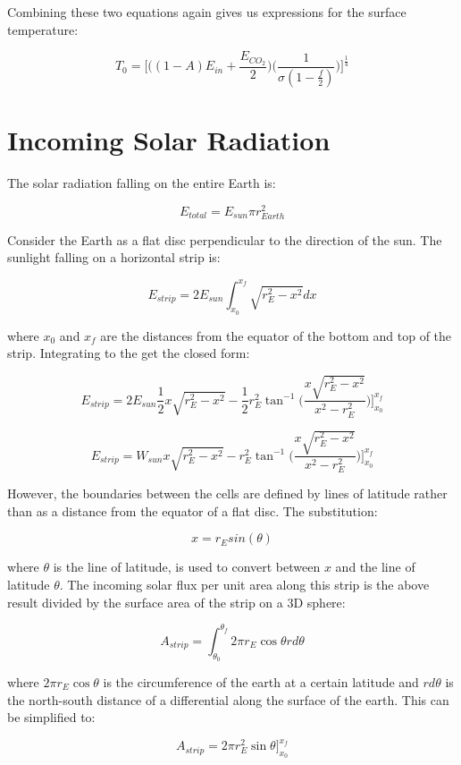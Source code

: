 \documentclass[12pt]{article} %
\begin{document}
Combining these two equations again gives us expressions for the surface temperature:

$$\boxed{T_0 = \bigg[ \bigg((1-A)E_{in} + \frac{E_{CO_2}}{2}\bigg)\bigg(\frac{1}{\sigma(1-\frac{f}{2})}\bigg)\bigg] ^{\frac{1}{4}}}$$

\newpage
\section{Incoming Solar Radiation}
\label{sec:radiation}

The solar radiation falling on the entire Earth is:

$$E_{total} = E_{sun} \pi r_{Earth}^2$$

Consider the Earth as a flat disc perpendicular to the direction of the sun. The sunlight falling on a horizontal strip is:

$$E_{strip} = 2 E_{sun} \int_{x_0}^{x_f} \sqrt{r_{E}^2 - x^2} dx$$


where $x_0$ and $x_f$ are the distances from the equator of the bottom and top of the strip. Integrating to the get the closed form:

$$E_{strip} = 2 E_{sun} \frac{1}{2} x \sqrt{r_{E}^2 - x^2} - \frac{1}{2} r_{E}^2 \tan^{-1}\bigg({\frac{x \sqrt{r_{E}^2 - x^2}}{x^2 - r_{E}^2 }}\bigg)\bigg]_{x_0}^{x_f}$$

$$E_{strip} = W_{sun} x \sqrt{r_{E}^2 - x^2} -  r_{E}^2 \tan^{-1}\bigg({\frac{x \sqrt{r_{E}^2 - x^2}}{x^2 - r_{E}^2 }}\bigg)\bigg]_{x_0}^{x_f}$$

However, the boundaries between the cells are defined by lines of latitude rather than as a distance from the equator of a flat disc. The substitution: 

$$x = r_{E} sin(\theta) $$

where $\theta$ is the line of latitude, is used to convert between $x$ and the line of latitude $\theta$. The incoming solar flux per
unit area along this strip is the above result divided by the surface area of the strip on a 3D sphere:

$$A_{strip} = \int_{\theta_{0}}^{\theta_{f}} 2 \pi r_{E} \cos{\theta} r d\theta $$

where $2 \pi r_{E} \cos{\theta}$ is the circumference of the earth at a certain latitude and $r d\theta$ is the north-south distance of a differential along the surface of the earth. This can be simplified to:

$$A_{strip} =  2 \pi r_{E}^2 \sin{\theta}\bigg]_{x_0}^{x_f} $$
\end{document}
